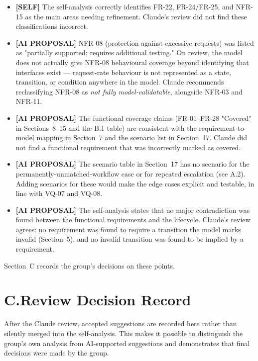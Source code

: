 \documentclass[11pt,a4paper]{article}
\begin{document}
\begin{itemize}
  \item \textbf{[SELF]} The self-analysis correctly identifies FR-22, FR-24/FR-25, and NFR-15 as the main areas needing refinement. Claude's review did not find these classifications incorrect.
  \item \textbf{[AI PROPOSAL]} NFR-08 (protection against excessive requests) was listed as "partially supported; requires additional testing." On review, the model does not actually give NFR-08 behavioural coverage beyond identifying that interfaces exist — request-rate behaviour is not represented as a state, transition, or condition anywhere in the model. Claude recommends reclassifying NFR-08 as \textit{not fully model-validatable}, alongside NFR-03 and NFR-11.
  \item \textbf{[AI PROPOSAL]} The functional coverage claims (FR-01–FR-28 "Covered" in Sections~8–15 and the B.1 table) are consistent with the requirement-to-model mapping in Section~7 and the scenario list in Section~17. Claude did not find a functional requirement that was incorrectly marked as covered.
  \item \textbf{[AI PROPOSAL]} The scenario table in Section~17 has no scenario for the permanently-unmatched-workflow case or for repeated escalation (see A.2). Adding scenarios for these would make the edge cases explicit and testable, in line with VQ-07 and VQ-08.
  \item \textbf{[AI PROPOSAL]} The self-analysis states that no major contradiction was found between the functional requirements and the lifecycle. Claude's review agrees: no requirement was found to require a transition the model marks invalid (Section~5), and no invalid transition was found to be implied by a requirement.
\end{itemize}

Section~C records the group's decisions on these points.

\section*{C.\enspace Review Decision Record}

After the Claude review, accepted suggestions are recorded here rather than silently merged into the self-analysis. This makes it possible to distinguish the group's own analysis from AI-supported suggestions and demonstrates that final decisions were made by the group.
\end{document}

